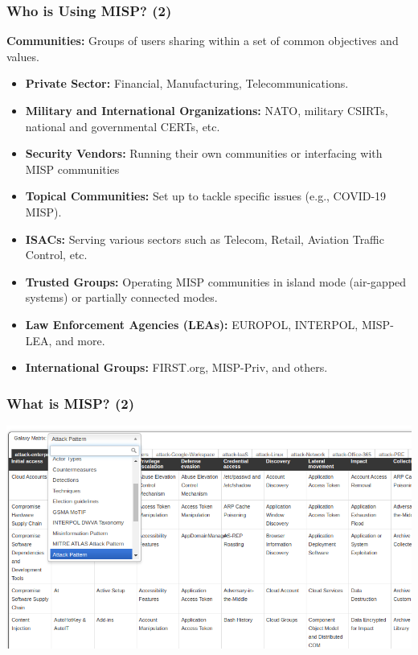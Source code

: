 \begin{frame}
    \frametitle{Who is Using MISP? (2)}
    \textbf{Communities:} Groups of users sharing within a set of common objectives and values.
    \vspace{1em}
    \begin{itemize}
        \item \textbf{Private Sector:} Financial, Manufacturing, Telecommunications.
        \item \textbf{Military and International Organizations:} NATO, military CSIRTs, national and governmental CERTs, etc.
        \item \textbf{Security Vendors:} Running their own communities or interfacing with MISP communities
        \item \textbf{Topical Communities:} Set up to tackle specific issues (e.g., COVID-19 MISP).
        \item \textbf{ISACs:} Serving various sectors such as Telecom, Retail, Aviation Traffic Control, etc.
        \item \textbf{Trusted Groups:} Operating MISP communities in island mode (air-gapped systems) or partially connected modes.
        \item \textbf{Law Enforcement Agencies (LEAs):} EUROPOL, INTERPOL, MISP-LEA, and more.
        \item \textbf{International Groups:} FIRST.org, MISP-Priv, and others.
    \end{itemize}
\end{frame}

\begin{frame}
    \frametitle{What is MISP? (2)}
    \begin{center}
        \includegraphics[width=1.0\linewidth]{galaxy-matrix.png}
    \end{center}
\end{frame}

